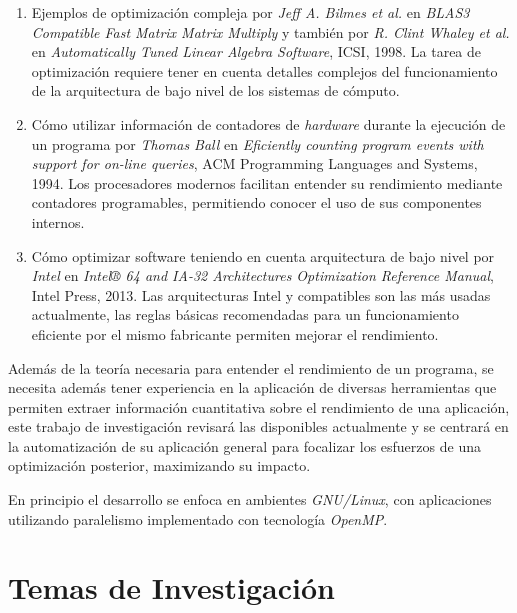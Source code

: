 \documentclass[a4paper]{article}
\begin{document}
\begin{enumerate}
\bigskip

\item Ejemplos de optimización compleja por {\it Jeff A. Bilmes et al.} en {\it BLAS3 Compatible Fast Matrix Matrix Multiply} y también por {\it R. Clint Whaley et al.} en {\it Automatically Tuned Linear Algebra Software}, ICSI, 1998. La tarea de optimización requiere tener en cuenta detalles complejos del funcionamiento de la arquitectura de bajo nivel de los sistemas de cómputo.

\bigskip

\item Cómo utilizar información de contadores de {\it hardware} durante la ejecución de un programa por {\it Thomas Ball} en {\it Eficiently counting program events with support for on-line queries}, ACM Programming Languages and Systems, 1994. Los procesadores modernos facilitan entender su rendimiento mediante contadores programables, permitiendo conocer el uso de sus componentes internos.

\bigskip

\item Cómo optimizar software teniendo en cuenta arquitectura de bajo nivel por {\it Intel} en {\it Intel® 64 and IA-32 Architectures Optimization Reference Manual}, Intel Press, 2013. Las arquitecturas Intel y compatibles son las más usadas actualmente, las reglas básicas recomendadas para un funcionamiento eficiente por el mismo fabricante permiten mejorar el rendimiento.

\end{enumerate}

Además de la teoría necesaria para entender el rendimiento de un programa, se necesita además tener experiencia en la aplicación de diversas herramientas que permiten extraer información cuantitativa sobre el rendimiento de una aplicación, este trabajo de investigación revisará las disponibles actualmente y se centrará en la automatización de su aplicación general para focalizar los esfuerzos de una optimización posterior, maximizando su impacto.

\bigskip

En principio el desarrollo se enfoca en ambientes {\it GNU/Linux}, con aplicaciones utilizando paralelismo implementado con tecnología {\it OpenMP}.

\section{Temas de Investigación}
\end{document}
